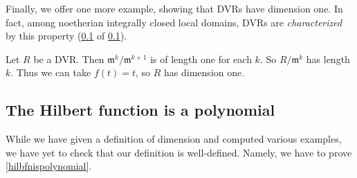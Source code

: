 Finally, we offer one more example, showing that DVRs have dimension one. In
fact, among noetherian integrally closed local domains, DVRs are
\emph{characterized} by this property (\cref{} of \cref{}).

\begin{example}
Let $R$ be a DVR. Then $\mathfrak{m}^k/\mathfrak{m}^{k+1}$ is of length one for
each $k$. So $R/\mathfrak{m}^k$ has length $k$. Thus we can take $f(t) = t$, so
$R$ has dimension one.
\end{example} 

\subsection{The Hilbert function is a polynomial} 

While we have given a definition of dimension and computed various examples,
we have yet to check that our definition is well-defined. 
Namely, we have to prove \cref{hilbfnispolynomial}.

